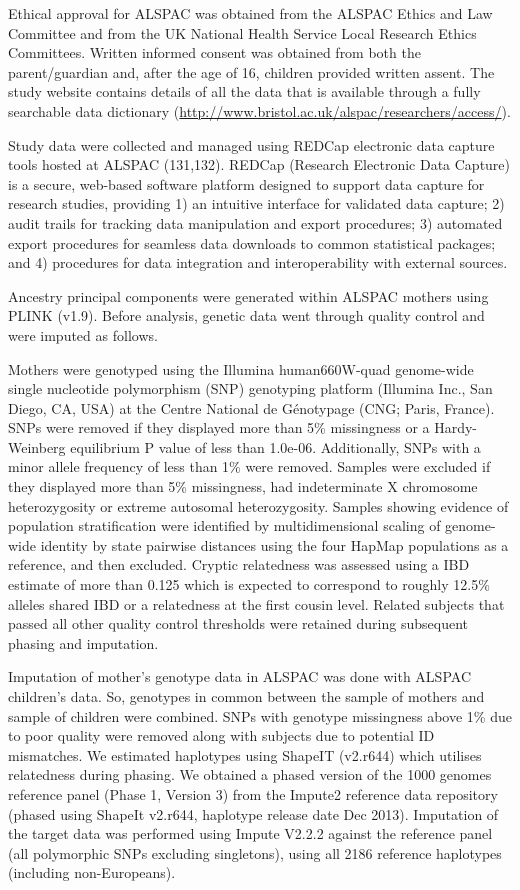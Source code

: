 \documentclass[11pt,oneside]{bristolthesis}
\begin{document}
Ethical approval for ALSPAC was obtained from the ALSPAC Ethics and Law Committee and from the UK National Health Service Local Research Ethics Committees. Written informed consent was obtained from both the parent/guardian and, after the age of 16, children provided written assent. The study website contains details of all the data that is available through a fully searchable data dictionary (\url{http://www.bristol.ac.uk/alspac/researchers/access/}).

Study data were collected and managed using REDCap electronic data capture tools hosted at ALSPAC (131,132). REDCap (Research Electronic Data Capture) is a secure, web-based software platform designed to support data capture for research studies, providing 1) an intuitive interface for validated data capture; 2) audit trails for tracking data manipulation and export procedures; 3) automated export procedures for seamless data downloads to common statistical packages; and 4) procedures for data integration and interoperability with external sources.

Ancestry principal components were generated within ALSPAC mothers using PLINK (v1.9). Before analysis, genetic data went through quality control and were imputed as follows.

Mothers were genotyped using the Illumina human660W-quad genome-wide single nucleotide polymorphism (SNP) genotyping platform (Illumina Inc., San Diego, CA, USA) at the Centre National de Génotypage (CNG; Paris, France). SNPs were removed if they displayed more than 5\% missingness or a Hardy-Weinberg equilibrium P value of less than 1.0e-06. Additionally, SNPs with a minor allele frequency of less than 1\% were removed. Samples were excluded if they displayed more than 5\% missingness, had indeterminate X chromosome heterozygosity or extreme autosomal heterozygosity. Samples showing evidence of population stratification were identified by multidimensional scaling of genome-wide identity by state pairwise distances using the four HapMap populations as a reference, and then excluded. Cryptic relatedness was assessed using a IBD estimate of more than 0.125 which is expected to correspond to roughly 12.5\% alleles shared IBD or a relatedness at the first cousin level. Related subjects that passed all other quality control thresholds were retained during subsequent phasing and imputation.

Imputation of mother's genotype data in ALSPAC was done with ALSPAC children's data. So, genotypes in common between the sample of mothers and sample of children were combined. SNPs with genotype missingness above 1\% due to poor quality were removed along with subjects due to potential ID mismatches. We estimated haplotypes using ShapeIT (v2.r644) which utilises relatedness during phasing. We obtained a phased version of the 1000 genomes reference panel (Phase 1, Version 3) from the Impute2 reference data repository (phased using ShapeIt v2.r644, haplotype release date Dec 2013). Imputation of the target data was performed using Impute V2.2.2 against the reference panel (all polymorphic SNPs excluding singletons), using all 2186 reference haplotypes (including non-Europeans).
\end{document}
